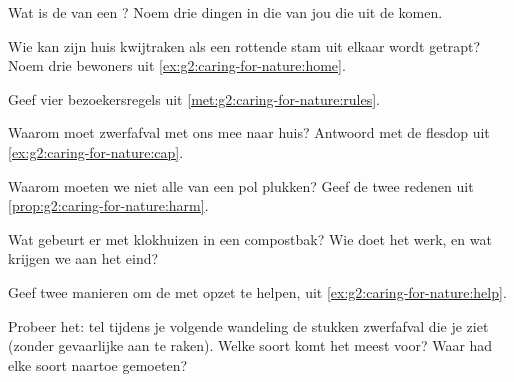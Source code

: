 \begin{exercise}[$\star$]\label{exo:g2:caring-for-nature:1}
Wat is de  van een ? Noem drie dingen in die van
jou die uit de  komen.
\end{exercise}

\begin{exercise}[$\star$]\label{exo:g2:caring-for-nature:2}
Wie kan zijn huis kwijtraken als een rottende stam uit elkaar wordt
getrapt? Noem drie bewoners uit \cref{ex:g2:caring-for-nature:home}.
\end{exercise}

\begin{exercise}[$\star$]\label{exo:g2:caring-for-nature:3}
Geef vier bezoekersregels uit \cref{met:g2:caring-for-nature:rules}.
\end{exercise}

\begin{exercise}[$\star$]\label{exo:g2:caring-for-nature:4}
Waarom moet zwerfafval met ons mee naar huis? Antwoord met de flesdop
uit \cref{ex:g2:caring-for-nature:cap}.
\end{exercise}

\begin{exercise}[$\star$]\label{exo:g2:caring-for-nature:5}
Waarom moeten we niet alle  van een pol plukken? Geef de twee
redenen uit \cref{prop:g2:caring-for-nature:harm}.
\end{exercise}

\begin{exercise}[$\star$]\label{exo:g2:caring-for-nature:6}
Wat gebeurt er met klokhuizen in een compostbak? Wie doet het werk, en
wat krijgen we aan het eind?
\end{exercise}

\begin{exercise}[$\star$]\label{exo:g2:caring-for-nature:7}
Geef twee manieren om de  met opzet te helpen, uit
\cref{ex:g2:caring-for-nature:help}.
\end{exercise}

\begin{exercise}[$\star$]\label{exo:g2:caring-for-nature:8}
Probeer het: tel tijdens je volgende wandeling de stukken zwerfafval die
je ziet (zonder gevaarlijke aan te raken). Welke soort komt het meest
voor? Waar had elke soort naartoe gemoeten?
\end{exercise}

